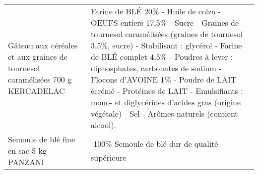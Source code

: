 \begin{longtable}{p{5cm}p{10cm}}
                            Gâteau aux céréales et aux graines de tournesol caramélisées 700 g KERCADELAC &                                                                                                                                                                                                                                                                                                                                                                                                                                                                                                                                                                                                Farine de BLÉ 20\% - Huile de colza - OEUFS entiers 17,5\% - Sucre - Graines de tournesol caramélisées (graines de tournesol 3,5\%, sucre) - Stabilisant : glycérol - Farine de BLÉ complet 4,5\% - Poudres à lever : diphosphates, carbonates de sodium - Flocons d'AVOINE 1\% - Poudre de LAIT écrémé - Protéines de LAIT - Emulsifiants : mono- et diglycérides d'acides gras (origine végétale) - Sel - Arômes naturels (contient alcool). \\
                                                                  Semoule de blé fine en sac 5 kg PANZANI &                                                                                                                                                                                                                                                                                                                                                                                                                                                                                                                                                                                                                                                                                                                                                                                                                                                                                                                                                                                           100\% Semoule de blé dur de qualité supérieure \\

\end{longtable}
